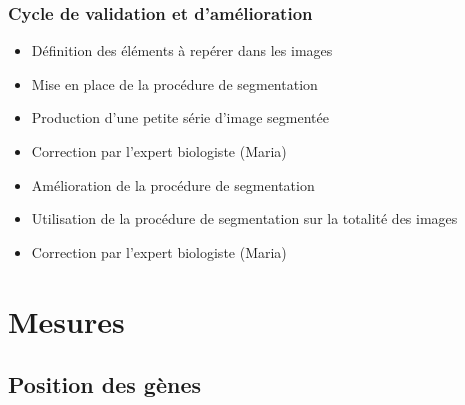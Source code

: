 \documentclass{beamer}
\begin{document}
{\begin{center}
%    
     \end{center} 
    }
    
    \frame
    {
      \frametitle{Cycle de validation et d'amélioration}
      \begin{itemize}
        \item<1-> Définition des éléments à repérer dans les images
        \item<2-> Mise en place de la procédure de segmentation
        \item<2-> Production d'une petite série d'image segmentée
        \item<3-> Correction par l'expert biologiste (Maria)
        \item<4-> Amélioration de la procédure de segmentation
        \item<4-> Utilisation de la procédure de segmentation sur la totalité des images
        \item<5-> Correction par l'expert biologiste (Maria)
      \end{itemize}
    }
    
\section{Mesures}
    
  \subsection{Position des gènes}
    
\end{document}
